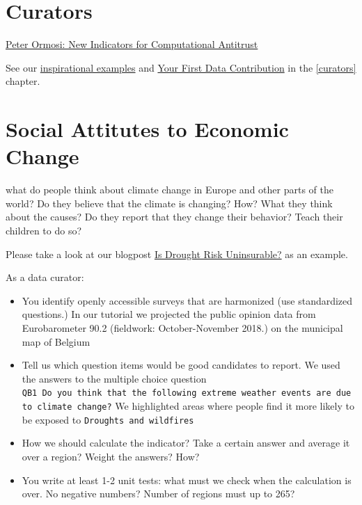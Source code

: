 \documentclass[
  a4paper,
  openany, a4paper, oneside]{book}
\providecommand{\tightlist}{%
  \setlength{\itemsep}{0pt}\setlength{\parskip}{0pt}}
\begin{document}
\hypertarget{curators-1}{%
\section{Curators}\label{curators-1}}

\href{https://economy.dataobservatory.eu/post/2021-06-02-data-curator-peter-ormosi/}{Peter Ormosi: New Indicators for Computational Antitrust}

See our \href{\%7B\#get-inspired\%7D}{inspirational examples} and \protect\hyperlink{first-contribution}{Your First Data Contribution} in the \ref{curators} chapter.

\hypertarget{social-attitutes-to-economic-change}{%
\section{Social Attitutes to Economic Change}\label{social-attitutes-to-economic-change}}

what do people think about climate change in Europe and other parts of the world? Do they believe that the climate is changing? How? What they think about the causes? Do they report that they change their behavior? Teach their children to do so?

Please take a look at our blogpost \href{http://greendeal.dataobservatory.eu/post/2021-04-23-belgium-flood-insurance/}{Is Drought Risk Uninsurable?} as an example.

As a data curator:

\begin{itemize}
\tightlist
\item
  You identify openly accessible surveys that are harmonized (use standardized questions.) In our tutorial we projected the public opinion data from Eurobarometer 90.2 (fieldwork: October-November 2018.) on the municipal map of Belgium
\item
  Tell us which question items would be good candidates to report. We used the answers to the multiple choice question \texttt{QB1\ Do\ you\ think\ that\ the\ following\ extreme\ weather\ events\ are\ due\ to\ climate\ change?} We highlighted areas where people find it more likely to be exposed to \texttt{Droughts\ and\ wildfires}
\item
  How we should calculate the indicator? Take a certain answer and average it over a region? Weight the answers? How?
\item
  You write at least 1-2 unit tests: what must we check when the calculation is over. No negative numbers? Number of regions must up to 265?
\end{itemize}
\end{document}
